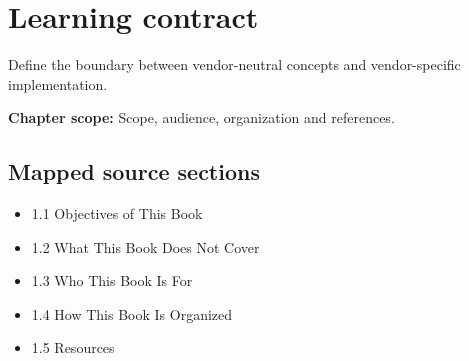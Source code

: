 \documentclass[10pt,letterpaper]{article}
\begin{document}
\sourceStatement
\tableofcontents
\newpage
\section{Learning contract}
\begin{takeaway}
Define the boundary between vendor-neutral concepts and vendor-specific implementation.
\end{takeaway}
\textbf{Chapter scope:} Scope, audience, organization and references.\\
\subsection{Mapped source sections}
\begin{itemize}
\item 1.1 Objectives of This Book
\item 1.2 What This Book Does Not Cover
\item 1.3 Who This Book Is For
\item 1.4 How This Book Is Organized
\item 1.5 Resources
\end{itemize}
\end{document}
